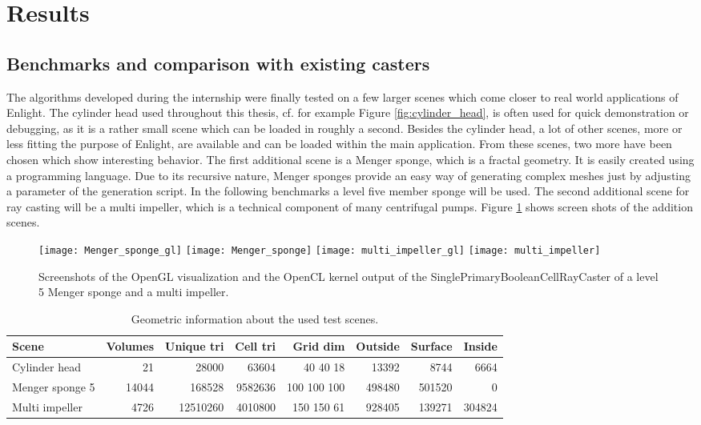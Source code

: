 \section{Results}
\label{sec:results}


\subsection{Benchmarks and comparison with existing casters}

The algorithms developed during the internship were finally tested on a few larger scenes which come closer to real world applications of Enlight. The cylinder head used throughout this thesis, cf. for example Figure \ref{fig:cylinder_head}, is often used for quick demonstration or debugging, as it is a rather small scene which can be loaded in roughly a second. Besides the cylinder head, a lot of other scenes, more or less fitting the purpose of Enlight, are available and can be loaded within the main application. From these scenes, two more have been chosen which show interesting behavior. The first additional scene is a Menger sponge, which is a fractal geometry. It is easily created using a programming language. Due to its recursive nature, Menger sponges provide an easy way of generating complex meshes just by adjusting a parameter of the generation script. In the following benchmarks a level five member sponge will be used. The second additional scene for ray casting will be a multi impeller, which is a technical component of many centrifugal pumps. Figure \ref{fig:Menger_sponge_multi_impeller} shows screen shots of the addition scenes.

\begin{figure}
\centering
\texttt{[image: Menger\_sponge\_gl]}
\texttt{[image: Menger\_sponge]}
\texttt{[image: multi\_impeller\_gl]}
\texttt{[image: multi\_impeller]}
\caption{Screenshots of the OpenGL visualization and the OpenCL kernel output of the SinglePrimaryBooleanCellRayCaster of a level 5 Menger sponge and a multi impeller.}
\label{fig:Menger_sponge_multi_impeller}
\end{figure}

\begin{table}[h]
\centering
\begin{tabular}{|l | r r r r r r r|}
\hline
Scene & Volumes & Unique tri & Cell tri & Grid dim & Outside & Surface & Inside \\
\hline
Cylinder head & 21 & 28000 & 63604 & 40 40 18 & 13392 & 8744 & 6664 \\
Menger sponge 5 & 14044 & 168528 & 9582636 & 100 100 100 & 498480 & 501520 & 0 \\
Multi impeller & 4726 & 12510260 & 4010800 & 150 150 61 & 928405 & 139271 & 304824 \\
\hline
\end{tabular}
\caption{Geometric information about the used test scenes.}
\label{tbl:geometrics}
\end{table}

